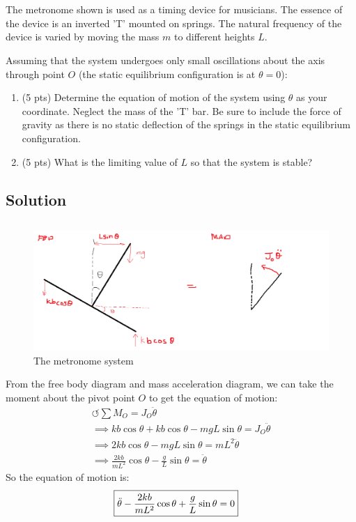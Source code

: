 \section{}
The metronome shown is used as a timing device for musicians. The essence of the device is an
inverted 'T' mounted on springs. The natural frequency of the device is varied by moving the mass
$m$ to different heights $L$.

Assuming that the system undergoes only small oscillations about the axis through point $O$ (the
static equilibrium configuration is at $\theta = 0$):
\begin{enumerate}[label=(\alph*)]
    \item (5 pts) Determine the equation of motion of the system using $\theta$ as your coordinate.
        Neglect the mass of the 'T' bar. Be sure to include the force of gravity as there is no
        static deflection of the springs in the static equilibrium configuration.
    \item (5 pts) What is the limiting value of $L$ so that the system is stable?
\end{enumerate}

\subsection*{Solution}
\subsection{}
\begin{figure}[h]
    \centering
    \includegraphics[width=0.7\linewidth]{Questions/Figures/q1 fbd.png}
    \caption{The metronome system}
    \label{fig:q1_fbd-png}
\end{figure}
From the free body diagram and mass acceleration diagram, we can take the moment about the 
pivot point $O$ to get the equation of motion:
\begin{gather*}
    \circlearrowleft \sum M_O = J_O \ddot{\theta} \\
    \implies k b \cos \theta + k b \cos \theta - mg L \sin \theta = J_O \ddot{\theta} \\
    \implies 2kb \cos\theta - mgL \sin\theta = mL^2 \ddot{\theta} \\
    \implies \frac{2kb}{mL^2}\cos\theta -\frac{g}{L} \sin\theta = \ddot{\theta}
\end{gather*}
So the equation of motion is:
\begin{align*}
    \Aboxed{\ddot{\theta} - \frac{2kb}{mL^2} \cos\theta + \frac{g}{L} \sin\theta &= 0}
\end{align*}
